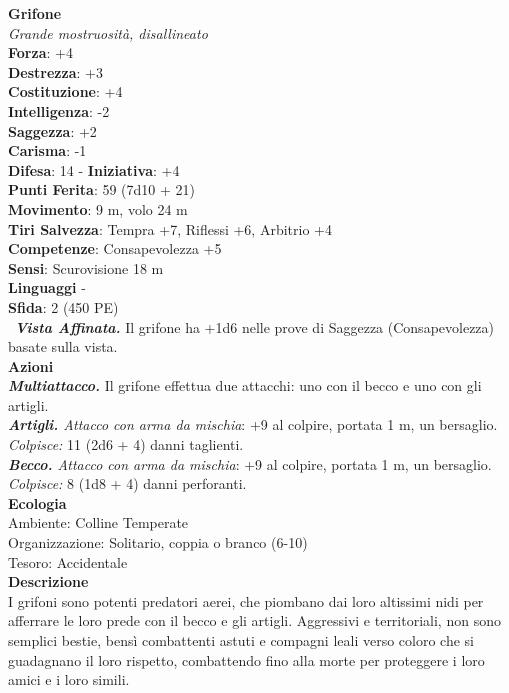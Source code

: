 \begin{multicols}{2}
\medskip\textbf{Grifone}\\
\emph{Grande mostruosità, disallineato}\\
\textbf{Forza}: +4\\
\textbf{Destrezza}: +3\\
\textbf{Costituzione}: +4\\
\textbf{Intelligenza}: -2\\
\textbf{Saggezza}: +2\\
\textbf{Carisma}: -1\\
\textbf{Difesa}: 14 - \textbf{Iniziativa}: +4\\
\textbf{Punti Ferita}: 59 (7d10 + 21)\\
\textbf{Movimento}: 9 m, volo 24 m\\
\textbf{Tiri Salvezza}: Tempra +7, Riflessi +6, Arbitrio +4\\
\textbf{Competenze}: Consapevolezza +5\\
\textbf{Sensi}: Scurovisione 18 m\\
\textbf{Linguaggi} -\\
\textbf{Sfida}: 2 (450 PE)\smallskip\\\
\emph{\textbf{Vista Affinata.}} Il grifone ha +1d6 nelle prove di Saggezza (Consapevolezza) basate sulla vista.\\
\smallskip\textbf{Azioni}\\
\emph{\textbf{Multiattacco.}} Il grifone effettua due attacchi: uno con il becco e uno con gli artigli.\\
\emph{\textbf{Artigli.} Attacco con arma da mischia}: +9 al colpire, portata 1 m, un bersaglio.\\
\emph{Colpisce:} 11 (2d6 + 4) danni taglienti.\\
\emph{\textbf{Becco.} Attacco con arma da mischia}: +9 al colpire, portata 1 m, un bersaglio.\\
\emph{Colpisce:} 8 (1d8 + 4) danni perforanti.\\
\textbf{Ecologia}\\
Ambiente: Colline Temperate\\
Organizzazione: Solitario, coppia o branco (6-10)\\
Tesoro: Accidentale\\
\textbf{Descrizione}\\
I grifoni sono potenti predatori aerei, che piombano dai loro altissimi nidi per afferrare le loro prede con il becco e gli artigli. Aggressivi e territoriali, non sono semplici bestie, bensì combattenti astuti e compagni leali verso coloro che si guadagnano il loro rispetto, combattendo fino alla morte per proteggere i loro amici e i loro simili.\\


\end{multicols}

